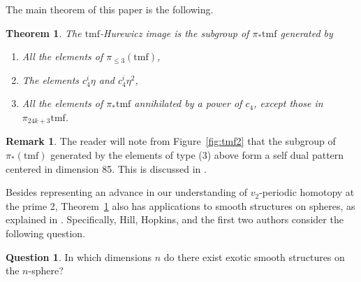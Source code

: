 \documentclass[10pt]{amsart}
\newcommand{\tmf}{\mathrm{tmf}}
\newtheorem{thm}[equation]{Theorem}
\theoremstyle{definition}
\newtheorem{rmk}[equation]{Remark}
\newtheorem{question}[equation]{Question}
\numberwithin{equation}{section}
\numberwithin{figure}{section}
\begin{document}
The main theorem of this paper is the following.

\begin{thm}\label{thm:main}
The $\tmf$-Hurewicz image is the subgroup of $\pi_*\tmf$ generated by 
\begin{enumerate}
\item All the elements of $\pi_{\le 3}(\tmf)$,
\item The elements $c_4^i \eta$ and $c_4^i \eta^2$,
\item All the elements of $\pi_*\tmf$ annihilated by a power of $c_4$, \emph{except} those in $\pi_{24k+3}\tmf$.
\end{enumerate}
\end{thm}

\begin{rmk}
The reader will note from Figure~\ref{fig:tmf2} that the subgroup of $\pi_*(\tmf)$ generated by the elements of type (3) above form a self dual pattern centered in dimension 85.  This is discussed in \cite[Ch.~10]{BrunerRognes}.
\end{rmk}

Besides representing an advance in our understanding of $v_2$-periodic homotopy at the prime 2, Theorem~\ref{thm:main} also has applications to smooth structures on spheres, as explained in \cite{BHHM2}.  Specifically, Hill, Hopkins, and the first two authors consider the following question.

\begin{question}\label{ques:exotic}
In which dimensions $n$ do there exist exotic smooth structures on the $n$-sphere?
\end{question}
\end{document}
